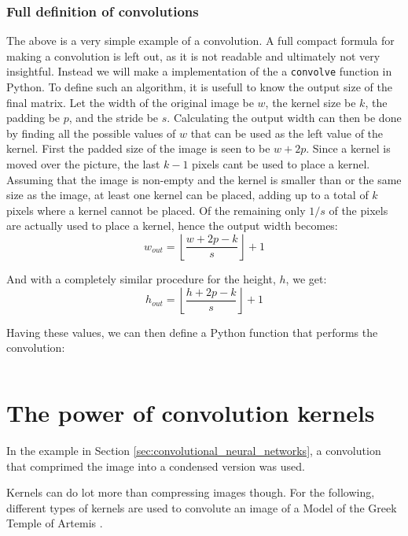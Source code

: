 \subsubsection{Full definition of convolutions}\label{sec:convolution_definition}
The above is a very simple example of a convolution.
A full compact formula for making a convolution is left out, as it is not readable and
ultimately not very insightful.
Instead we will make a implementation of the a \verb|convolve| function in Python.
To define such an algorithm, it is usefull to know the output size of the final matrix.
Let the width of the original image be $w$, the kernel size be $k$, the padding be $p$, and the stride be $s$.
Calculating the output width can then be done by finding all the possible values of $w$ that can be
used as the left value of the kernel.
First the padded size of the image is seen to be $w + 2p$.
Since a kernel is moved over the picture, the last $k-1$ pixels cant be used to place a kernel.
Assuming that the image is non-empty and the kernel is smaller than or the same size as the image,
at least one kernel can be placed, adding up to a total of $k$ pixels where a kernel cannot be placed.
Of the remaining only $1/s$ of the pixels are actually used to place a kernel, hence the output width becomes:
\begin{equation}
    w_{out} = \left\lfloor \frac{w + 2p - k}{s}\right\rfloor + 1
\end{equation}

And with a completely similar procedure for the height, $h$, we get:
\begin{equation}
    h_{out} = \left\lfloor \frac{h + 2p - k}{s} \right\rfloor + 1
\end{equation}

Having these values, we can then define a Python function that performs the convolution:

\inputminted[]{python}{src/convolve.py}

\section{The power of convolution kernels}
In the example in Section \ref{sec:convolutional_neural_networks}, a convolution that
comprimed the image into a condensed version was used.

Kernels can do lot more than compressing images though.
For the following, different types of kernels are used to convolute an image of a Model of the Greek Temple of Artemis \cite{greek-temple-picture}.

